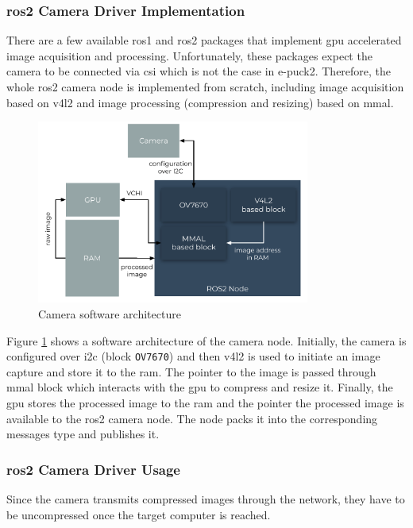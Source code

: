 \subsubsection{\ac{ros2} Camera Driver Implementation}
There are a few available \ac{ros1} and \ac{ros2} packages that implement \ac{gpu} accelerated image acquisition and processing.
Unfortunately, these packages expect the camera to be connected via \ac{csi} which is not the case in e-puck2. 
Therefore, the whole \ac{ros2} camera node is implemented from scratch, including image acquisition based on \acs{v4l2} and image processing (compression and resizing) based on \ac{mmal}.
 
 \begin{figure}[H]
    \centering
    \includegraphics[width=0.8\textwidth]{physical/figures/camera_software_architecture.pdf}
    \caption{Camera software architecture}
    \label{fig:physical:camera_software_architecture}
\end{figure}
 
Figure \ref{fig:physical:camera_software_architecture} shows a software architecture of the camera node. 
Initially, the camera is configured over \ac{i2c} (block \texttt{OV7670}) and then \ac{v4l2} is used to initiate an image capture and store it to the \ac{ram}.
The pointer to the image is passed through \ac{mmal} block which interacts with the \ac{gpu} to compress and resize it. 
Finally, the \ac{gpu} stores the processed image to the \ac{ram} and the pointer the processed image is available to the \ac{ros2} camera node.
The node packs it into the corresponding messages type and publishes it.
 
 \subsubsection{\ac{ros2} Camera Driver Usage}
 Since the camera transmits compressed images through the network, they have to be uncompressed once the target computer is reached.
 
